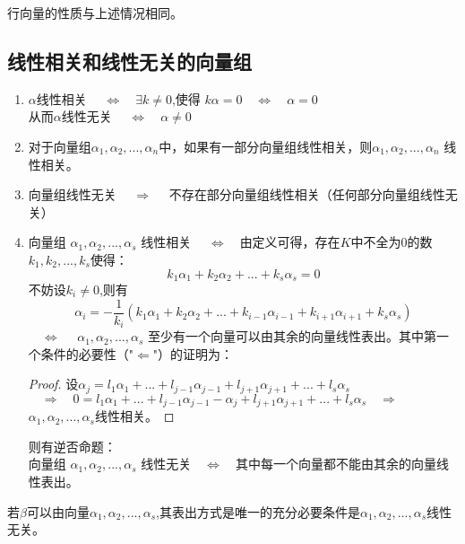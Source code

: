 \documentclass[blue,normal,cn]{elegantnote}
\begin{document}
行向量的性质与上述情况相同。

\subsection{线性相关和线性无关的向量组}
\begin{enumerate}[(1)]
    \item $α$线性相关 $\quad \Longleftrightarrow \quad \exists k≠0$,使得 $kα=0 \quad \Longleftrightarrow \quad α=0$\\从而$α$线性无关  $\quad \Longleftrightarrow \quad  α ≠ 0$
    \item 对于向量组$α_1,α_2,...,α_n$中，如果有一部分向量组线性相关，则$α_1,α_2,...,α_n$ 线性相关。
    \item 向量组线性无关   $\quad \Longrightarrow \quad$ 不存在部分向量组线性相关（任何部分向量组线性无关）
    \item 向量组 $α_1,α_2,...,α_s$ 线性相关 $\quad \Longleftrightarrow \quad$由定义可得，存在$K$中不全为$0$的数$k_1,k_2,...,k_s$使得：
        \begin{equation*}
            k_1α_1+k_2α_2+...+k_sα_s=0
        \end{equation*}
        不妨设$k_i≠ 0$,则有
        \begin{equation*}
            α_i=-\frac{1}{k_i}(k_1α_1+k_2α_2+...+k_{i-1}α_{i-1}+k_{i+1}α_{i+1}+k_sα_s)
        \end{equation*}
        $\quad \Longleftrightarrow \quad$ $α_1,α_2,...,α_s$ 至少有一个向量可以由其余的向量线性表出。其中第一个条件的必要性（"$\Leftarrow$"）的证明为：
        \begin{proof}
            设$α_j=l_1α_1+...+l_{j-1} α_{j-1}+l_{j+1} α_{j+1}+...+l_s α_s$\\
            $\quad \Longrightarrow \quad 0=l_1α_1+...+l_{j-1} α_{j-1}-α_j+l_{j+1} α_{j+1}+...+l_s α_s   \quad \Longrightarrow \quad $
            $α_1,α_2,...,α_s$线性相关。
        \end{proof}
        则有逆否命题：
        \\向量组 $α_1,α_2,...,α_s$ 线性无关$\quad \Longleftrightarrow \quad$其中每一个向量都不能由其余的向量线性表出。
\end{enumerate}


\begin{proposition}
若$β$可以由向量$α_1,α_2,...,α_s$,其表出方式是唯一的充分必要条件是$α_1,α_2,...,α_s$线性无关。
\end{proposition}
\end{document}
